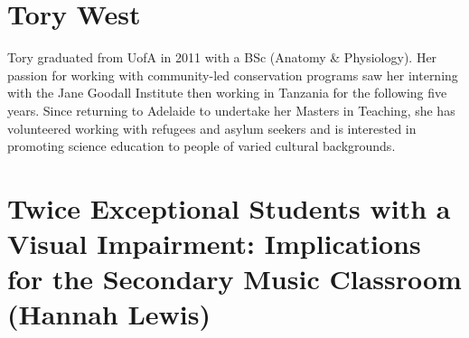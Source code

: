 \documentclass[twoside,12pt,a4paper,notitlepage]{memoir}
\begin{document}
\section*{Tory West}

Tory graduated from UofA in 2011 with a BSc (Anatomy \& Physiology). Her passion for working with community-led conservation programs saw her interning with the Jane Goodall Institute then working in Tanzania for the following five years. Since returning to Adelaide to undertake her Masters in Teaching, she has volunteered working with refugees and asylum seekers and is interested in promoting science education to people of varied cultural backgrounds.



\pagebreak
\section*{Twice Exceptional Students with a Visual Impairment: Implications for the Secondary Music Classroom (Hannah Lewis)}
\label{aut:lewis}
\end{document}
